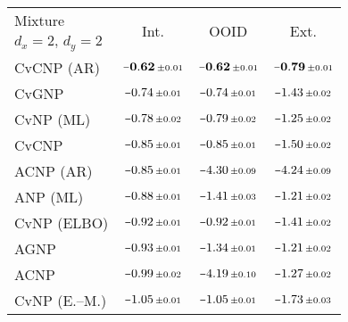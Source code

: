 \begin{tabular}[t]{lccc} 
\toprule 
Mixture & \multirow{2}{*}{Int.} & \multirow{2}{*}{OOID} & \multirow{2}{*}{Ext.} \\ 
$d_x\!=\!2,\,d_y\!=\!2$ \\ \midrule 
CvCNP (AR) & $\mathbf{\scalebox{0.7}[1]{$-$}0.62}\,{ \scriptstyle \pm  0.01 }$ & $\mathbf{\scalebox{0.7}[1]{$-$}0.62}\,{ \scriptstyle \pm  0.01 }$ & $\mathbf{\scalebox{0.7}[1]{$-$}0.79}\,{ \scriptstyle \pm  0.01 }$ \\ 
CvGNP & $\scalebox{0.7}[1]{$-$}0.74\,{ \scriptstyle \pm  0.01 }$ & $\scalebox{0.7}[1]{$-$}0.74\,{ \scriptstyle \pm  0.01 }$ & $\scalebox{0.7}[1]{$-$}1.43\,{ \scriptstyle \pm  0.02 }$ \\ 
CvNP (ML) & $\scalebox{0.7}[1]{$-$}0.78\,{ \scriptstyle \pm  0.02 }$ & $\scalebox{0.7}[1]{$-$}0.79\,{ \scriptstyle \pm  0.02 }$ & $\scalebox{0.7}[1]{$-$}1.25\,{ \scriptstyle \pm  0.02 }$ \\ 
CvCNP & $\scalebox{0.7}[1]{$-$}0.85\,{ \scriptstyle \pm  0.01 }$ & $\scalebox{0.7}[1]{$-$}0.85\,{ \scriptstyle \pm  0.01 }$ & $\scalebox{0.7}[1]{$-$}1.50\,{ \scriptstyle \pm  0.02 }$ \\ 
ACNP (AR) & $\scalebox{0.7}[1]{$-$}0.85\,{ \scriptstyle \pm  0.01 }$ & $\scalebox{0.7}[1]{$-$}4.30\,{ \scriptstyle \pm  0.09 }$ & $\scalebox{0.7}[1]{$-$}4.24\,{ \scriptstyle \pm  0.09 }$ \\ 
ANP (ML) & $\scalebox{0.7}[1]{$-$}0.88\,{ \scriptstyle \pm  0.01 }$ & $\scalebox{0.7}[1]{$-$}1.41\,{ \scriptstyle \pm  0.03 }$ & $\scalebox{0.7}[1]{$-$}1.21\,{ \scriptstyle \pm  0.02 }$ \\ 
CvNP (ELBO) & $\scalebox{0.7}[1]{$-$}0.92\,{ \scriptstyle \pm  0.01 }$ & $\scalebox{0.7}[1]{$-$}0.92\,{ \scriptstyle \pm  0.01 }$ & $\scalebox{0.7}[1]{$-$}1.41\,{ \scriptstyle \pm  0.02 }$ \\ 
AGNP & $\scalebox{0.7}[1]{$-$}0.93\,{ \scriptstyle \pm  0.01 }$ & $\scalebox{0.7}[1]{$-$}1.34\,{ \scriptstyle \pm  0.01 }$ & $\scalebox{0.7}[1]{$-$}1.21\,{ \scriptstyle \pm  0.02 }$ \\ 
ACNP & $\scalebox{0.7}[1]{$-$}0.99\,{ \scriptstyle \pm  0.02 }$ & $\scalebox{0.7}[1]{$-$}4.19\,{ \scriptstyle \pm  0.10 }$ & $\scalebox{0.7}[1]{$-$}1.27\,{ \scriptstyle \pm  0.02 }$ \\ 
CvNP (E.--M.) & $\scalebox{0.7}[1]{$-$}1.05\,{ \scriptstyle \pm  0.01 }$ & $\scalebox{0.7}[1]{$-$}1.05\,{ \scriptstyle \pm  0.01 }$ & $\scalebox{0.7}[1]{$-$}1.73\,{ \scriptstyle \pm  0.03 }$ \\ 

\end{tabular}
